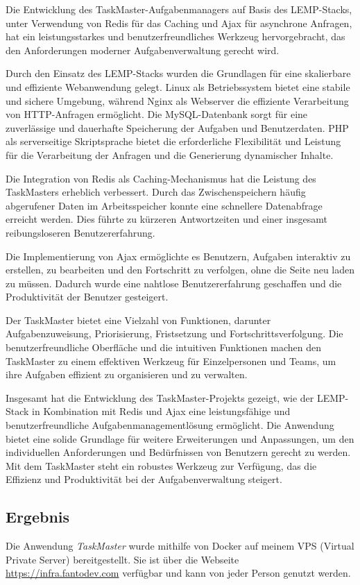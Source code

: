 Die Entwicklung des TaskMaster-Aufgabenmanagers auf Basis des LEMP-Stacks, unter Verwendung von Redis für das Caching und Ajax für asynchrone Anfragen, hat ein leistungsstarkes und benutzerfreundliches Werkzeug hervorgebracht, das den Anforderungen moderner Aufgabenverwaltung gerecht wird.

Durch den Einsatz des LEMP-Stacks wurden die Grundlagen für eine skalierbare und effiziente Webanwendung gelegt. Linux als Betriebssystem bietet eine stabile und sichere Umgebung, während Nginx als Webserver die effiziente Verarbeitung von HTTP-Anfragen ermöglicht. Die MySQL-Datenbank sorgt für eine zuverlässige und dauerhafte Speicherung der Aufgaben und Benutzerdaten. PHP als serverseitige Skriptsprache bietet die erforderliche Flexibilität und Leistung für die Verarbeitung der Anfragen und die Generierung dynamischer Inhalte.

Die Integration von Redis als Caching-Mechanismus hat die Leistung des TaskMasters erheblich verbessert. Durch das Zwischenspeichern häufig abgerufener Daten im Arbeitsspeicher konnte eine schnellere Datenabfrage erreicht werden. Dies führte zu kürzeren Antwortzeiten und einer insgesamt reibungsloseren Benutzererfahrung.

Die Implementierung von Ajax ermöglichte es Benutzern, Aufgaben interaktiv zu erstellen, zu bearbeiten und den Fortschritt zu verfolgen, ohne die Seite neu laden zu müssen. Dadurch wurde eine nahtlose Benutzererfahrung geschaffen und die Produktivität der Benutzer gesteigert.

Der TaskMaster bietet eine Vielzahl von Funktionen, darunter Aufgabenzuweisung, Priorisierung, Fristsetzung und Fortschrittsverfolgung. Die benutzerfreundliche Oberfläche und die intuitiven Funktionen machen den TaskMaster zu einem effektiven Werkzeug für Einzelpersonen und Teams, um ihre Aufgaben effizient zu organisieren und zu verwalten.

Insgesamt hat die Entwicklung des TaskMaster-Projekts gezeigt, wie der LEMP-Stack in Kombination mit Redis und Ajax eine leistungsfähige und benutzerfreundliche Aufgabenmanagementlösung ermöglicht. Die Anwendung bietet eine solide Grundlage für weitere Erweiterungen und Anpassungen, um den individuellen Anforderungen und Bedürfnissen von Benutzern gerecht zu werden. Mit dem TaskMaster steht ein robustes Werkzeug zur Verfügung, das die Effizienz und Produktivität bei der Aufgabenverwaltung steigert.

\subsection*{Ergebnis}

Die Anwendung \emph{TaskMaster} wurde mithilfe von Docker auf meinem VPS (Virtual Private Server) bereitgestellt. Sie ist über die Webseite \url{https://infra.fantodev.com} verfügbar und kann von jeder Person genutzt werden.